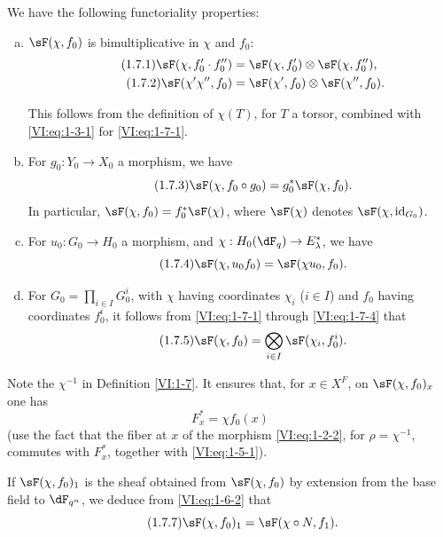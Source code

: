 \documentclass[oneside]{book}
\theoremstyle{sga-source}
\theoremstyle{sga-source-dash}
\theoremstyle{sga-source-dotdash}
\theoremstyle{sga-source-number-note-dash}
\theoremstyle{sga-source-note-number-dotdash}
\theoremstyle{sga-source-example-dotdash}
\theoremstyle{sga-source-inline-number}
\theoremstyle{sga-source-bare-number}
\theoremstyle{sga-source}
\newcommand{\PrintPage}[1]{}\newcommand{\MathPage}[1]{}\newcommand{\PrintCite}[2]{#1}\newcommand{\var}[3]{#2}
\begin{document}
We have the following functoriality properties:
\begin{enumerate}[a)]
  \item $\sF(\chi,f_0)$ is bimultiplicative in $\chi$ and $f_0$: 
    \begin{align*}\tag{1.7.1}\label{VI:eq:1-7-1}
      \sF(\chi,f_0'\cdot f_0'') &= \sF(\chi,f_0')\otimes \sF(\chi,f_0'') \text{,} \\
      \tag{1.7.2}\label{VI:eq:1-7-2}
      \sF(\chi'\chi'',f_0) &= \sF(\chi',f_0)\otimes \sF(\chi'',f_0) \text{.}
    \end{align*}
    \PrintPage{173}
This follows from the definition of $\chi(T)$, for $T$ a torsor, combined 
    with \eqref{VI:eq:1-3-1} for \eqref{VI:eq:1-7-1}. 
  \item For $g_0:Y_0\to X_0$ a morphism, we have 
    \begin{equation*}\tag{1.7.3}\label{VI:eq:1-7-3}
      \sF(\chi,f_0\circ g_0) = g_0^\ast \sF(\chi,f_0) \text{.}
    \end{equation*}
    In particular, $\sF(\chi,f_0) = f_0^\ast \sF(\chi)$, where $\sF(\chi)$ 
    denotes $\sF(\chi,\operatorname{id}_{G_0})$. 
  \item For $u_0:G_0\to H_0$ a morphism, and 
    $\chi:H_0(\dF_q) \to E_\lambda^\ast$, we have 
    \begin{equation*}\tag{1.7.4}\label{VI:eq:1-7-4}
      \sF(\chi,u_0 f_0) = \sF(\chi u_0,f_0) \text{.}
    \end{equation*}
  \item For $G_0=\prod_{i\in I} G_0^i$, with $\chi$ having coordinates $\chi_i$ 
    ($i\in I$) and $f_0$ having coordinates $f_0^i$, it follows from 
    \eqref{VI:eq:1-7-1} through \eqref{VI:eq:1-7-4} that 
    \begin{equation*}\tag{1.7.5}\label{VI:eq:1-7-5}
      \sF(\chi,f_0) = \bigotimes_{i\in I} \sF(\chi_i,f_0^i) \text{.}
    \end{equation*}    
\end{enumerate}

Note the $\chi^{-1}$ in Definition \ref{VI:1-7}. It ensures that, for 
$x\in X^F$, on $\sF(\chi,f_0)_x$ one has 
\begin{equation*}\tag{1.7.6}\label{VI:eq:1-7-6}
  F_x^\ast = \chi f_0(x)
\end{equation*}
(use the fact that the fiber at $x$ of the morphism \eqref{VI:eq:1-2-2}, for 
$\rho=\chi^{-1}$, commutes with $F_x^\ast$, together with \eqref{VI:eq:1-5-1}). 

If $\sF(\chi,f_0)_1$ is the sheaf obtained from $\sF(\chi,f_0)$ by extension 
from the base field to $\dF_{q^n}$, we deduce from \eqref{VI:eq:1-6-2} that 
\begin{equation*}\tag{1.7.7}\label{VI:eq:1-7-7}
  \sF(\chi,f_0)_1 = \sF(\chi\circ N,f_1) \text{.}
\end{equation*}
\end{document}
